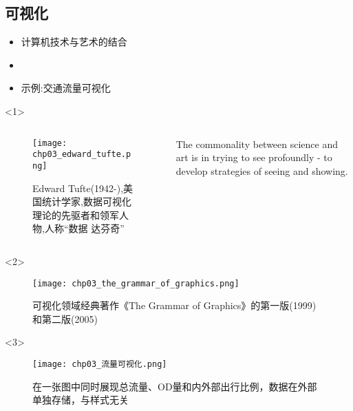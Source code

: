 \subsection{可视化}
\begin{frame}[t]{\subsecname}
\begin{itemize}
\item<1-> 计算机技术与艺术的结合
\item<2-> 
\item<3-> 示例:交通流量可视化
\end{itemize}

\begin{overlayarea}{\textwidth}{\textheight}
  \begin{onlyenv}<1>
  \begin{columns}
    \begin{column}{.4\textwidth}
      \begin{figure}
        \centering \texttt{[image: chp03\_edward\_tufte.png]}
        \caption{\scriptsize Edward Tufte(1942-),美国统计学家,数据可视化理论的先驱者和领军人物,人称“数据
    达芬奇”}
      \end{figure}
    \end{column}

    \begin{column}{.6\textwidth}
  \begin{ornamentblock}
    {The commonality between science and art is in trying to see profoundly - to develop strategies of seeing and showing.\\
      }
  \end{ornamentblock}
    \end{column}
  \end{columns}
  \end{onlyenv}

\vspace{-10pt}
  \begin{onlyenv}<2>
\begin{figure}[ht]
  \centering
  \texttt{[image: chp03\_the\_grammar\_of\_graphics.png]}
  \caption{可视化领域经典著作《The Grammar of Graphics》的第一版(1999)和第二版(2005)}
\end{figure}
  \end{onlyenv}

  \begin{onlyenv}<3>
\begin{figure}[ht]
  \centering
  \texttt{[image: chp03\_流量可视化.png]}
  \caption{在一张图中同时展现总流量、OD量和内外部出行比例，数据在外部单独存储，与样式无关}
\end{figure}
  \end{onlyenv}
\end{overlayarea}
\end{frame}

